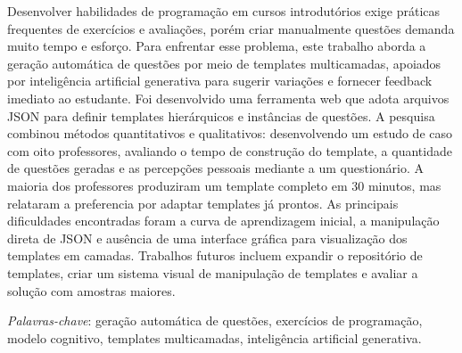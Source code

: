 \begin{resumo}
Desenvolver habilidades de programação em cursos introdutórios exige práticas frequentes de exercícios e avaliações, porém criar manualmente questões demanda muito tempo e esforço. Para enfrentar esse problema, este trabalho aborda a geração automática de questões por meio de templates multicamadas, apoiados por inteligência artificial generativa para sugerir variações e fornecer feedback imediato ao estudante. Foi desenvolvido uma ferramenta web que adota arquivos JSON para definir templates hierárquicos e instâncias de questões. A pesquisa combinou métodos quantitativos e qualitativos: desenvolvendo um estudo de caso com oito professores, avaliando o tempo de construção do template, a quantidade de questões geradas e as percepções pessoais mediante a um questionário. A maioria dos professores produziram um template completo em 30 minutos, mas relataram a preferencia por adaptar templates já prontos. As principais dificuldades encontradas foram a curva de aprendizagem inicial, a manipulação direta de JSON e ausência de uma interface gráfica para visualização dos templates em camadas. Trabalhos futuros incluem expandir o repositório de templates, criar um sistema visual de manipulação de templates e avaliar a solução com amostras maiores. 
  \bigbreak

  \noindent
  \textit{Palavras-chave}: geração automática de questões, exercícios de programação, modelo cognitivo, templates multicamadas, inteligência artificial generativa.
\end{resumo}